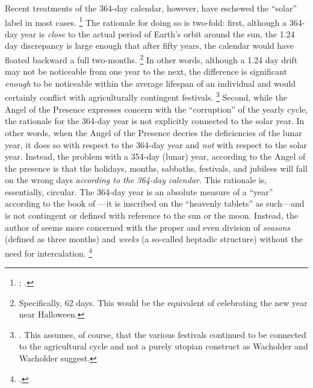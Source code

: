 Recent treatments of the 364-day calendar, however, have eschewed the ``solar'' label in most cases.%
    \footnote{\cite[231]{glessmer_flint-vanderkam1999}\cite[80]{bendov_steele2011}; \cite[438]{jacobus_brooke-hempel2018}.}
The rationale for doing so is two-fold: first, although a 364-day year is \emph{close} to the actual period of Earth's orbit around the sun, the 1.24 day discrepancy is large enough that after fifty years, the calendar would have floated backward a full two-months.%
    \footnote{Specifically, 62 days. This would be the equivalent of celebrating the new year near Halloween.}
In other words, although a 1.24 day drift may not be noticeable from one year to the next, the difference is significant \emph{enough} to be noticeable within the average lifespan of an individual and would certainly conflict with agriculturally contingent festivals.%
    \footnote{\cite[28--37]{wacholder-wacholder_huca1995}. This assumes, of course, that the various festivals continued to be connected to the agricultural cycle and not a purely utopian construct as Wacholder and Wacholder suggest.}
Second, while the Angel of the Presence expresses concern with the ``corruption'' of the yearly cycle, the rationale for the 364-day year is not explicitly connected to the solar year. In other words, when the Angel of the Presence decries the deficiencies of the lunar year, it does so with respect to the 364-day year and \emph{not} with respect to the solar year. Instead, the problem with a 354-day (lunar) year, according to the Angel of the presence is that the holidays, months, sabbaths, festivals, and jubilees will fall on the wrong days \emph{according to the 364-day calendar}. This rationale is, essentially, circular. The 364-day year is an absolute measure of a ``year'' according to the book of \jub---it is inscribed on the ``heavenly tablets'' as such---and is not contingent or defined with reference to the sun or the moon. Instead, the author of \jub seems more concerned with the proper and even division of \emph{seasons} (defined as three months) and \emph{weeks} (a so-called heptadic structure) without the need for intercalation.%
    \footnote{\cite[125]{bendov-saulnier_cbr2008}.}


